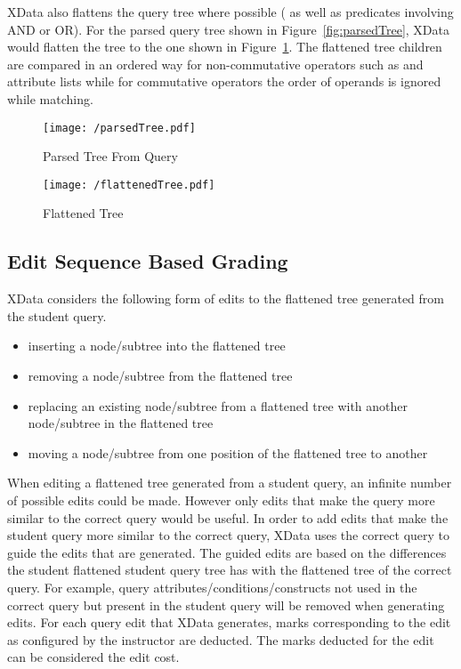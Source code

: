 XData also flattens the query tree where possible ( as well as predicates involving AND or OR).  For the parsed query tree shown in Figure~\ref{fig:parsedTree},  XData would flatten the tree to the one shown in Figure~\ref{fig:flattenedTree}. The flattened tree children are compared in an ordered way for non-commutative operators such as  and  attribute lists while for commutative operators the order of operands is ignored while matching. 


\begin{figure}
	\centering
	\begin{minipage}{0.40\textwidth}
	\centering
	\texttt{[image: /parsedTree.pdf]}
		\caption{Parsed Tree From Query}
		\label{fig:parsedTree}
	\end{minipage}
		\begin{minipage}{0.59\textwidth}
	\centering
	\texttt{[image: /flattenedTree.pdf]}
		\caption{Flattened Tree}
		\label{fig:flattenedTree}
	\end{minipage}
\end{figure}


\subsection{Edit Sequence Based Grading}
XData considers the following form of edits to the flattened tree generated from the student query.
\begin{itemize}
    \item  inserting a node/subtree into the flattened tree
\item removing a node/subtree from the flattened tree
\item replacing an existing node/subtree from a flattened tree
with another node/subtree in the flattened tree
\item moving a node/subtree from one position of the flattened
tree to another
\end{itemize}

When editing a flattened tree generated from a student query, an infinite number of possible edits could be made. However only edits that make the query more similar to the correct query would be useful. In order to add edits that make the student query more similar to the correct query, XData uses the correct query to guide the edits that are generated. The guided edits are based on the differences the student flattened student query tree has with the flattened tree of the correct query. For example, query attributes/conditions/constructs not used in the correct query but present in the student query will be removed when generating edits. 
For each query edit that XData generates, marks corresponding to the edit as configured by the instructor are deducted. The marks deducted for the edit can be considered the edit cost. 

